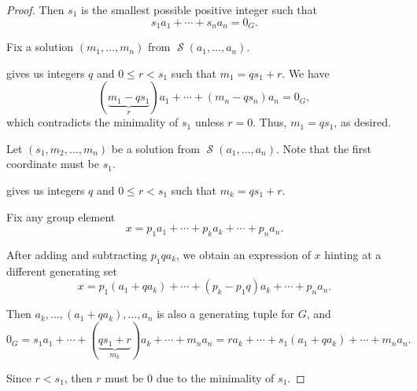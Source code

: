 \begin{proof}
  Then \( s_1 \) is the smallest possible positive integer such that
  \begin{equation}\label{eq:thm:fundamental_theorem_of_finitely_generated_abelian_groups/proof/equation_specific}
    s_1 a_1 + \cdots + s_n a_n = 0_G.
  \end{equation}

   Fix a solution \( (m_1, \ldots, m_n) \) from \( \mscrS(a_1, \ldots, a_n) \).

   gives us integers \( q \) and \( 0 \leq r < s_1 \) such that \( m_1 = qs_1 + r \). We have
  \begin{equation*}
    (\underbrace{m_1 - q s_1}_r) a_1 + \cdots + (m_n - q s_n) a_n = 0_G,
  \end{equation*}
  which contradicts the minimality of \( s_1 \) unless \( r = 0 \). Thus, \( m_1 = q s_1 \), as desired.

   Let \( (s_1, m_2, \ldots, m_n) \) be a solution from \( \mscrS(a_1, \ldots, a_n) \). Note that the first coordinate must be \( s_1 \).

   gives us integers \( q \) and \( 0 \leq r < s_1 \) such that \( m_k = q s_1 + r \).

  Fix any group element
  \begin{equation*}
    x = p_1 a_1 + \cdots + p_k a_k + \cdots + p_n a_n.
  \end{equation*}

  After adding and subtracting \( p_1 q a_k \), we obtain an expression of \( x \) hinting at a different generating set
  \begin{equation*}
    x = p_1 (a_1 + q a_k) + \cdots + (p_k - p_1 q) a_k + \cdots + p_n a_n.
  \end{equation*}

  Then \( a_k, \ldots, (a_1 + q a_k), \ldots, a_n \) is also a generating tuple for \( G \), and
  \begin{equation*}
    0_G
    =
    s_1 a_1 + \cdots + (\underbrace{q s_1 + r}_{m_k}) a_k + \cdots + m_n a_n
    =
    r a_k + \cdots + s_1 (a_1 + q a_k) + \cdots + m_n a_n.
  \end{equation*}

  Since \( r < s_1 \), then \( r \) must be \( 0 \) due to the minimality of \( s_1 \).


\end{proof}
